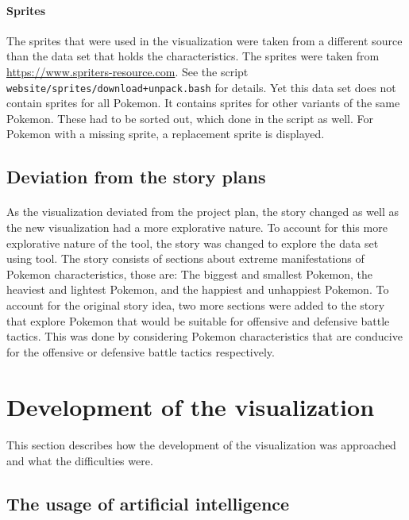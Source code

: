 \documentclass[12pt, a4paper]{article}
\begin{document}
			\paragraph{Sprites}
				The sprites that were used in the visualization were taken from a different source than the data set that holds the characteristics. The sprites were taken from \href{https://www.spriters-resource.com}{https://www.spriters-resource.com}. See the script \texttt{website/sprites/download+unpack.bash} for details. Yet this data set does not contain sprites for all Pokemon. It contains sprites for other variants of the same Pokemon. These had to be sorted out, which done in the script as well. For Pokemon with a missing sprite, a replacement sprite is displayed.
		\subsection{Deviation from the story plans}
			\paragraph{}
				As the visualization deviated from the project plan, the story changed as well as the new visualization had a more explorative nature. To account for this more explorative nature of the tool, the story was changed to explore the data set using tool. The story consists of sections about extreme manifestations of Pokemon characteristics, those are: The biggest and smallest Pokemon, the heaviest and lightest Pokemon, and the happiest and unhappiest Pokemon. To account for the original story idea, two more sections were added to the story that explore Pokemon that would be suitable for offensive and defensive battle tactics. This was done by considering Pokemon characteristics that are conducive for the offensive or defensive battle tactics respectively.
	\section{Development of the visualization}
		\paragraph{}
		This section describes how the development of the visualization was approached and what the difficulties were.
		\subsection{The usage of artificial intelligence}
\end{document}

